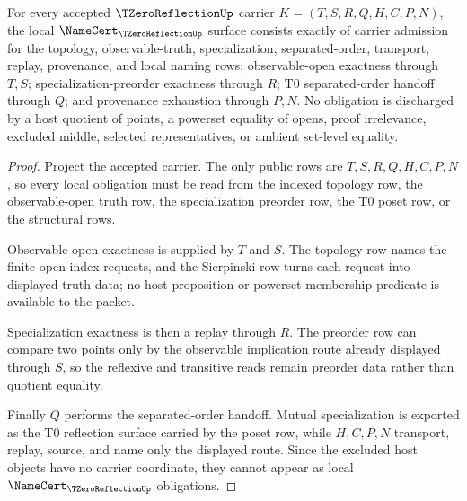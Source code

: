 \begin{theorem}
\label{thm:tzero-reflection-namecert-obligations}
For every accepted $\TZeroReflectionUp$ carrier $K=(T,S,R,Q,H,C,P,N)$, the local $\NameCert_{\TZeroReflectionUp}$ surface consists exactly of carrier admission for the topology, observable-truth, specialization, separated-order, transport, replay, provenance, and local naming rows; observable-open exactness through $T,S$; specialization-preorder exactness through $R$; T0 separated-order handoff through $Q$; and provenance exhaustion through $P,N$. No obligation is discharged by a host quotient of points, a powerset equality of opens, proof irrelevance, excluded middle, selected representatives, or ambient set-level equality.
\end{theorem}
\begin{proof}
Project the accepted carrier. The only public rows are $T,S,R,Q,H,C,P,N$, so every local obligation must be read from the indexed topology row, the observable-open truth row, the specialization preorder row, the T0 poset row, or the structural rows.

Observable-open exactness is supplied by $T$ and $S$. The topology row names the finite open-index requests, and the Sierpinski row turns each request into displayed truth data; no host proposition or powerset membership predicate is available to the packet.

Specialization exactness is then a replay through $R$. The preorder row can compare two points only by the observable implication route already displayed through $S$, so the reflexive and transitive reads remain preorder data rather than quotient equality.

Finally $Q$ performs the separated-order handoff. Mutual specialization is exported as the T0 reflection surface carried by the poset row, while $H,C,P,N$ transport, replay, source, and name only the displayed route. Since the excluded host objects have no carrier coordinate, they cannot appear as local $\NameCert_{\TZeroReflectionUp}$ obligations.
\end{proof}

